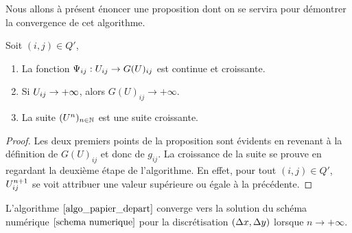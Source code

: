Nous allons à présent énoncer une proposition dont on se servira pour démontrer la convergence de cet algorithme.
\begin{proposition}
    Soit $(i,j)\in Q'$,
    \begin{enumerate}
        \item La fonction $\Psi_{ij} :U_{ij} \rightarrow G(U)_{ij}$ est continue et croissante.
        \item Si $U_{ij} \rightarrow +\infty$, alors $G(U)_{ij} \rightarrow +\infty$.
        \item La suite $(U^n)_{n\in\mathbb{N}}$ est une suite croissante.
    \end{enumerate}
\end{proposition}
\begin{proof}
    Les deux premiers points de la proposition sont évidents en revenant à la définition de $G(U)_{ij}$ et donc de $g_{ij}$. La croissance de la suite se prouve en regardant la deuxième étape de l'algorithme. En effet, pour tout $(i,j) \in Q'$, $U_{ij}^{n+1}$ se voit attribuer une valeur supérieure ou égale à la précédente.
\end{proof}
\begin{theorem}
    L'algorithme $\eqref{algo_papier_depart}$ converge vers la solution du schéma numérique $\eqref{schema numerique}$ pour la discrétisation $(\Delta x,\Delta y)$ lorsque $n \rightarrow +\infty$.
\end{theorem}
